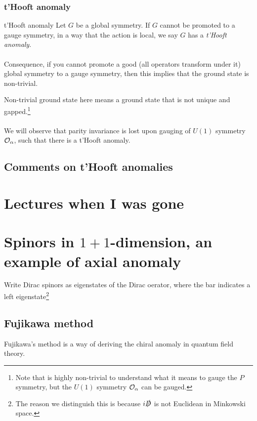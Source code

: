\subsubsection{t'Hooft anomaly}
\begin{mybox}{t'Hooft anomaly}
	Let $G$ be a global symmetry. If $G$ cannot be promoted to a gauge symmetry, in a way that the action is local, we say $G$ has a \emph{t'Hooft anomaly}.\\
\\
	Consequence, if you cannot promote a good (all operators transform under it) global symmetry to a gauge symmetry, then this implies that the ground state is non-trivial.
\end{mybox}
Non-trivial ground state here means a ground state that is not unique and gapped.\footnote{Note that is highly non-trivial to understand what it means to gauge the $P$ symmetry, but the $U(1)$ symmetry $\mathcal{O}_\alpha$ can be gauged.}
\\
\\
We will observe that parity invariance is lost upon gauging of $U(1)$ symmetry $\mathcal{O}_\alpha$, such that there is a t'Hooft anomaly.

\subsection{Comments on  t'Hooft anomalies}



























\section{Lectures when I was gone}
\section{Spinors in $1+1$-dimension, an example of axial anomaly}
Write Dirac spinors as eigenstates of the Dirac oerator, where the bar indicates a left eigenstate\footnote{The reason we distinguish this is because $i\slashed{D}$ is not Euclidean in Minkowski space.}
\subsection{Fujikawa method}
Fujikawa's method is a way of deriving the chiral anomaly in quantum field theory.